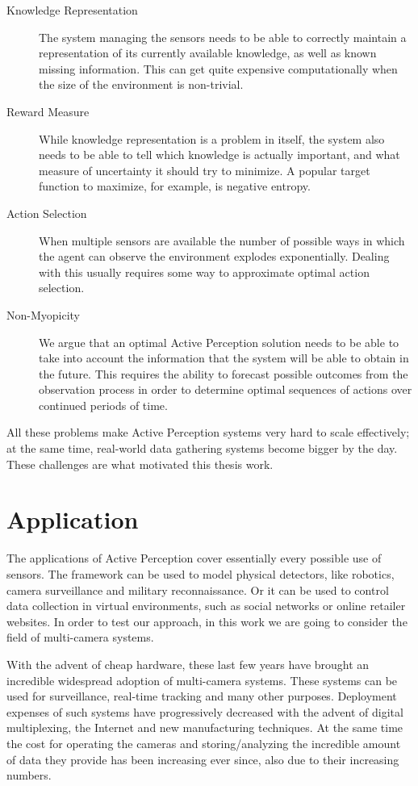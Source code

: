 \begin{description}
\item[Knowledge Representation] The system managing the sensors needs to be able to correctly
maintain a representation of its currently available knowledge, as well as known missing
information. This can get quite expensive computationally when the size of the environment is
non-trivial.
\item[Reward Measure] While knowledge representation is a problem in itself, the system also needs
to be able to tell which knowledge is actually important, and what measure of uncertainty it should
try to minimize. A popular target function to maximize, for example, is negative entropy.
\item[Action Selection] When multiple sensors are available the number of possible ways in which the
agent can observe the environment explodes exponentially. Dealing with this usually requires some way to
approximate optimal action selection.
\item[Non-Myopicity] We argue that an optimal Active Perception solution needs to be able to take into
account the information that the system will be able to obtain in the future. This requires the
ability to forecast possible outcomes from the observation process in order to determine optimal
sequences of actions over continued periods of time.
\end{description}

All these problems make Active Perception systems very hard to scale effectively; at the same time,
real-world data gathering systems become bigger by the day. These challenges are what motivated this
thesis work.

\section{Application}

The applications of Active Perception cover essentially every possible use of sensors. The framework
can be used to model physical detectors, like robotics, camera surveillance and military
reconnaissance. Or it can be used to control data collection in virtual environments, such as social
networks or online retailer websites. In order to test our approach, in this work we are going to
consider the field of multi-camera systems.

With the advent of cheap hardware, these last few years have brought an incredible widespread
adoption of multi-camera systems. These systems can be used for surveillance, real-time tracking and
many other purposes. Deployment expenses of such systems have progressively decreased with the
advent of digital multiplexing, the Internet and new manufacturing techniques. At the same time the
cost for operating the cameras and storing/analyzing the incredible amount of data they provide has
been increasing ever since, also due to their increasing numbers.

